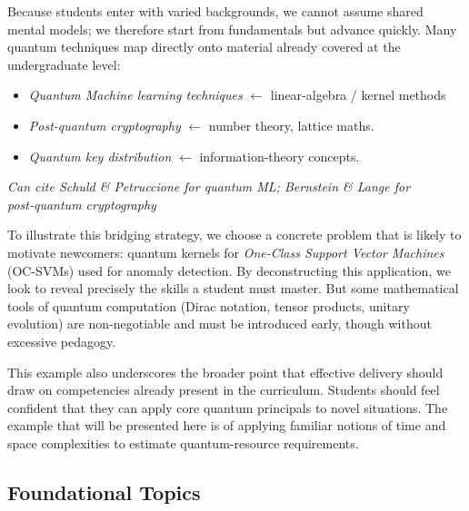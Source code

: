 

Because students enter with varied backgrounds, we cannot assume shared mental models; 
we therefore start from fundamentals but advance quickly.
Many quantum techniques map directly onto material already covered at the undergraduate level:

\begin{itemize}
	\item \emph{Quantum Machine learning techniques} $\leftarrow$ linear‑algebra / kernel methods
	\item \emph{Post-quantum cryptography} $\leftarrow$ number theory, lattice maths.
	\item \emph{Quantum key distribution} $\leftarrow$ information‑theory concepts.
\end{itemize}

\emph{Can cite Schuld \& Petruccione for quantum ML; Bernstein \& Lange for post‑quantum cryptography}

To illustrate this bridging strategy, we choose a concrete problem that is likely to motivate newcomers:
quantum kernels for \emph{One-Class Support Vector Machines} (OC-SVMs) used for anomaly detection.
By deconstructing this application, we look to reveal precisely the skills a student must master.
But some mathematical tools of quantum computation (Dirac notation, tensor products, unitary evolution)
are non‑negotiable and must be introduced early, though without excessive pedagogy.

This example also underscores the broader point that
effective delivery should draw on competencies already present in the curriculum.
Students should feel confident that they can apply core quantum principals to novel situations.  
The example that will be presented here is of applying familiar notions of time and space complexities 
to estimate quantum-resource requirements.

\subsection{Foundational Topics}

